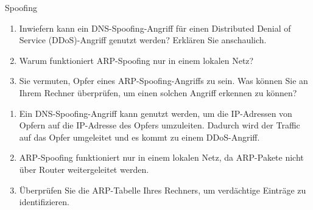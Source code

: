 \documentclass{article}
\begin{document}
\setcounter{subsection}{100}
\begin{exercise}{Spoofing}
  \begin{enumerate}
    \item Inwiefern kann ein DNS-Spoofing-Angriff für einen Distributed Denial of Service (DDoS)-Angriff genutzt werden? Erklären Sie anschaulich.
    \item Warum funktioniert ARP-Spoofing nur in einem lokalen Netz?
    \item Sie vermuten, Opfer eines ARP-Spoofing-Angriffs zu sein. Was können Sie an Ihrem Rechner überprüfen, um einen solchen Angriff erkennen zu können?
  \end{enumerate}

  \begin{solution}
    \begin{enumerate}
      \item Ein DNS-Spoofing-Angriff kann genutzt werden, um die IP-Adressen von Opfern auf die IP-Adresse des Opfers umzuleiten. Dadurch wird der Traffic auf das Opfer umgeleitet und es kommt zu einem DDoS-Angriff.
      \item ARP-Spoofing funktioniert nur in einem lokalen Netz, da ARP-Pakete nicht über Router weitergeleitet werden.
      \item Überprüfen Sie die ARP-Tabelle Ihres Rechners, um verdächtige Einträge zu identifizieren.
    \end{enumerate}
  \end{solution}
\end{exercise}
\end{document}
